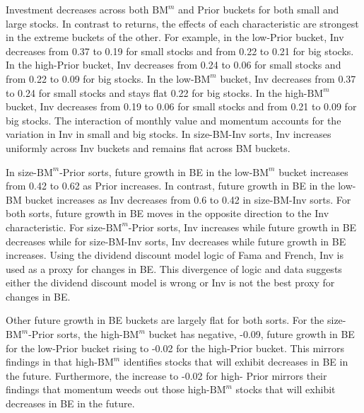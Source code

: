 Investment decreases across both $\text{BM}^m$ and Prior buckets for both small and large
stocks. In contrast to returns, the effects of each characteristic are strongest in the
extreme buckets of the other. For example, in the low-Prior bucket, Inv decreases from
0.37 to 0.19 for small stocks and from 0.22 to 0.21 for big stocks. In the high-Prior
bucket, Inv decreases from 0.24 to 0.06 for small stocks and from 0.22 to 0.09 for big
stocks. In the low-$\text{BM}^m$ bucket, Inv decreases from 0.37 to 0.24 for small stocks
and stays flat 0.22 for big stocks. In the high-$\text{BM}^m$ bucket, Inv decreases from
0.19 to 0.06 for small stocks and from 0.21 to 0.09 for big stocks. The interaction of
monthly value and momentum accounts for the variation in Inv in small and big stocks. In
size-BM-Inv sorts, Inv increases uniformly across Inv buckets and remains flat across BM
buckets.

In size-$\text{BM}^m$-Prior sorts, future growth in BE in the low-$\text{BM}^m$ bucket
increases from 0.42 to 0.62 as Prior increases. In contrast, future growth in BE in the
low-BM bucket increases as Inv decreases from 0.6 to 0.42 in size-BM-Inv sorts. For both
sorts, future growth in BE moves in the opposite direction to the Inv characteristic. For
size-$\text{BM}^m$-Prior sorts, Inv increases while future growth in BE decreases while
for size-BM-Inv sorts, Inv decreases while future growth in BE increases. Using the
dividend discount model logic of Fama and French, Inv is used as a proxy for changes in
BE. This divergence of logic and data suggests either the dividend discount model is wrong
or Inv is not the best proxy for changes in BE.

Other future growth in BE buckets are largely flat for both sorts. For the
size-$\text{BM}^m$-Prior sorts, the high-$\text{BM}^m$ bucket has negative, -0.09, future
growth in BE for the low-Prior bucket rising to -0.02 for the high-Prior bucket. This
mirrors findings in \textcite{kok2017facts} that high-$\text{BM}^m$ identifies stocks that
will exhibit decreases in BE in the future. Furthermore, the increase to -0.02 for high-
Prior mirrors their findings that momentum weeds out those high-$\text{BM}^m$ stocks that
will exhibit decreases in BE in the future.
